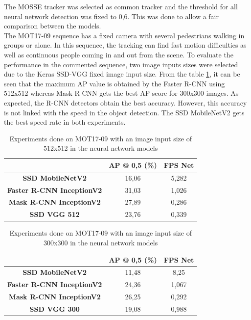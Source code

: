 The MOSSE tracker was selected as common tracker and the threshold for all neural network detection was fixed to 0,6. This was done to allow a fair comparison between the models.\\
The MOT17-09 sequence has a fixed camera with several pedestrians walking in groups or alone. In this sequence, the tracking can find fast motion difficulties as well as continuous people coming in and out from the scene. To evaluate the performance in the commented sequence, two image inputs sizes were selected due to the Keras SSD-VGG fixed image input size. From the table \ref{tab:net_exp_1}, it can be seen that the maximum AP value is obtained by the Faster R-CNN using 512x512 whereas Mask R-CNN gets the best AP score for 300x300 images. As expected, the R-CNN detectors obtain the best accuracy. However, this accuracy is not linked with the speed in the object detection. The SSD MobileNetV2 gets the best speed rate in both experiments.\\
\begin{table}[H]
\scriptsize
\begin{center}
\begin{tabular}{|c|c|c|}
\hline
\textbf{}                         & \textbf{AP @ 0,5 (\%)} & \textbf{FPS Net} \\ \hline
\textbf{SSD MobileNetV2}          & 16,06                  & 5,282            \\ \hline
\textbf{Faster R-CNN InceptionV2} & 31,03                  & 1,026            \\ \hline
\textbf{Mask R-CNN InceptionV2}   & 27,89                  & 0,286            \\ \hline
\textbf{SSD VGG 512}              & 23,76                  & 0,339            \\ \hline
\end{tabular}
\end{center}
\caption{Experiments done on MOT17-09 with an image input size of 512x512 in the neural network models}
\label{tab:net_exp_1}
\end{table}
\begin{table}[H]
\scriptsize
\begin{center}
\begin{tabular}{|c|c|c|}
\hline
\textbf{}                         & \textbf{AP @ 0,5 (\%)} & \textbf{FPS Net} \\ \hline
\textbf{SSD MobileNetV2}          & 11,48                  & 8,25             \\ \hline
\textbf{Faster R-CNN InceptionV2} & 24,36                  & 1,067            \\ \hline
\textbf{Mask R-CNN InceptionV2}   & 26,25                  & 0,292            \\ \hline
\textbf{SSD VGG 300}              & 19,08                  & 0,988            \\ \hline
\end{tabular}
\end{center}
\caption{Experiments done on MOT17-09 with an image input size of 300x300 in the neural network models}
\label{tab:net_exp_2}
\end{table}
